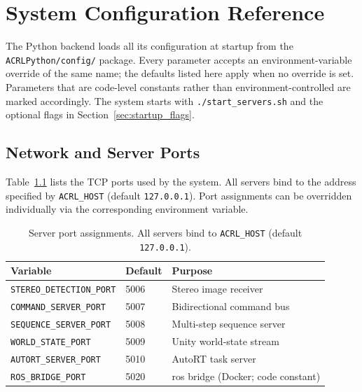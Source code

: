 \documentclass[
     12pt,
     a4paper,
     BCOR=10mm,
     DIV=14,
     listof=totoc,
     bibliography=totoc,
     parskip,
     twoside,
     headsepline
     ]{scrreprt}
\begin{document}

\newpage




\newpage
\clearpage
\appendix

\chapter{System Configuration Reference}\label{appendix:config}
The Python backend loads all its configuration at startup from the \texttt{ACRLPython/config/} package. Every parameter accepts an environment-variable override of the same name; the defaults listed here apply when no override is set. Parameters that are code-level constants rather than environment-controlled are marked accordingly. The system starts with \texttt{./start\_servers.sh} and the optional flags in Section~\ref{sec:startup_flags}.

\section{Network and Server Ports}\label{appendix:config:network}
Table~\ref{tab:config_ports} lists the TCP ports used by the system. All servers bind to the address specified by \texttt{ACRL\_HOST} (default \texttt{127.0.0.1}). Port assignments can be overridden individually via the corresponding environment variable.

\begin{table}[ht]
	\centering
	\begin{tabular}{llp{6cm}}
		\toprule
		\textbf{Variable}                & \textbf{Default} & \textbf{Purpose}                         \\
		\midrule
		\texttt{STEREO\_DETECTION\_PORT} & 5006             & Stereo image receiver                    \\
		\texttt{COMMAND\_SERVER\_PORT}   & 5007             & Bidirectional command bus                \\
		\texttt{SEQUENCE\_SERVER\_PORT}  & 5008             & Multi-step sequence server               \\
		\texttt{WORLD\_STATE\_PORT}      & 5009             & Unity world-state stream                 \\
		\texttt{AUTORT\_SERVER\_PORT}    & 5010             & AutoRT task server                       \\
		\texttt{ROS\_BRIDGE\_PORT}       & 5020             & \gls{ros} bridge (Docker; code constant) \\
		\bottomrule
	\end{tabular}
	\caption{Server port assignments. All servers bind to \texttt{ACRL\_HOST}
		(default \texttt{127.0.0.1}).}
	\label{tab:config_ports}
\end{table}
\end{document}
